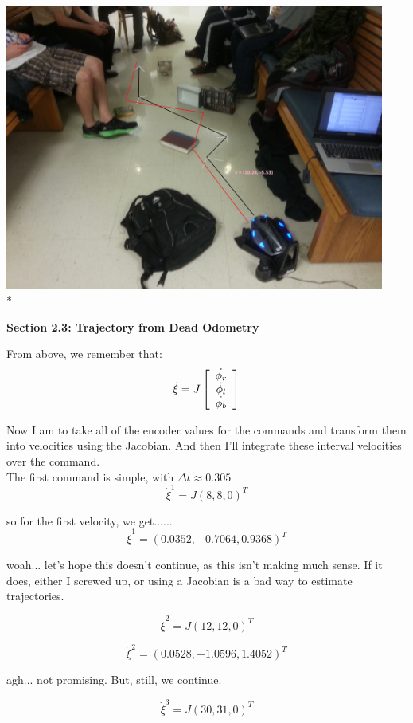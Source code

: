 \documentclass{article}
\begin{document}
{
\centering
\includegraphics[width=12.5cm]{estimated.jpg} \\*
}

\vspace{8mm}
\bf Section 2.3: Trajectory from Dead Odometry \rm
\vspace{4mm}

From above, we remember that:
$$ \dot{\xi} = 
J\left[\begin{array}{c}
\dot{\phi_r} \\
\dot{\phi_l} \\
\dot{\phi_b}
\end{array}\right] \\* 
$$

 Now I am to take all of the encoder values for the commands and transform them into velocities using the Jacobian. And then I'll integrate these interval velocities over the command. \\
The first command is simple, with $\Delta t \approx 0.305$
$$
\dot{\xi}^1 = J(8, 8, 0)^T
$$

so for the first velocity, we get......
$$
\dot{\xi}^1 = (0.0352, -0.7064, 0.9368)^T
$$

woah... let's hope this doesn't continue, as this isn't making much sense. If it does, either I screwed up, or using a Jacobian is a bad way to estimate trajectories.

$$
\dot{\xi}^2 = J(12, 12, 0)^T
$$

$$
\dot{\xi}^2 = (0.0528, -1.0596, 1.4052)^T
$$

agh... not promising. But, still, we continue.


$$
\dot{\xi}^3 = J(30, 31, 0)^T
$$
\end{document}
